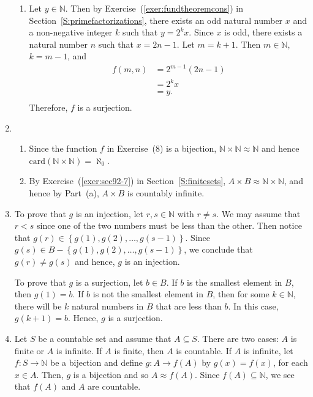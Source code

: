 \begin{enumerate}
\begin{enumerate}
\item Let $y \in \mathbb{N}$.  Then by Exercise~(\ref{exer:fundtheoremcons}) in Section~\ref{S:primefactorizations}, there exists an odd natural number $x$ and a non-negative integer $k$ such that $y = 2^k x$.  Since $x$ is odd, there exists a natural number $n$ such that 
$x = 2n - 1$.  Let $m = k + 1$.  Then $m \in \mathbb{N}$, $k = m - 1$, and
\[
\begin{aligned}
f \left( m, n \right) &= 2^{m - 1} \left( 2n - 1 \right) \\
                      &= 2^k x \\
                      &= y. \\
\end{aligned}
\]
Therefore, $f$ is a surjection.
\end{enumerate}

\item \begin{enumerate}
\item Since the function $f$ in Exercise~(8) is a bijection, 
$\mathbb{N} \times \mathbb{N} \approx \mathbb{N}$ and hence 
$\text{card} \left( \mathbb{N} \times \mathbb{N} \right) = \aleph_0$.

\item By Exercise~(\ref{exer:sec92-7}) in Section~\ref{S:finitesets}, 
$A \times B \approx \mathbb{N} \times \mathbb{N}$, and hence by Part~(a), $A \times B$ is countably infinite.
\end{enumerate}

\item To prove that $g$ is an injection, let $r, s \in \mathbb{N}$ with $r \ne s$.  We may assume that $r < s$ since one of the two numbers must be less than the other.  Then notice that 
$g \left( r \right) \in \left\{ g \left( 1 \right), g \left( 2 \right), \ldots, g \left( s-1 \right) \right\}$.  Since 
$g \left( s \right) \in B - \left\{ g \left( 1 \right), g \left( 2 \right), \ldots, g \left( s-1 \right) \right\}$, we conclude that $g \left( r \right) \ne g \left( s \right)$ and hence, $g$ is an injection.

To prove that $g$ is a surjection, let $b \in B$.  If $b$ is the smallest element in $B$, then 
$g \left( 1 \right) = b$.  If $b$ is not the smallest element in $B$,  then for some 
$k \in \mathbb{N}$, there will be $k$ natural numbers in $B$ that are less than $b$.  In this case, $g \left( k + 1 \right) = b$.  Hence, $g$ is a surjection.

\item Let $S$ be a countable set and assume that $A \subseteq S$.  There are two cases:  $A$ is finite or $A$ is infinite.  If $A$ is finite, then $A$ is countable.  If $A$ is infinite, let 
$f: S \to \mathbb{N}$ be a bijection and define $g: A \to f \left( A \right)$ by 
$g \left( x \right) = f \left( x \right)$, for each $x \in A$.  Then, $g$ is a bijection and so 
$A \approx f \left( A \right)$.  Since $f \left( A \right) \subseteq \mathbb{N}$, we see that 
$f \left( A \right)$ and $A$ are countable.


\end{enumerate}
